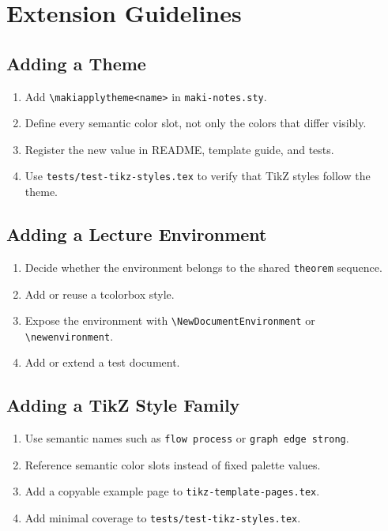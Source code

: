 \documentclass[a4paper,11pt]{ltxdoc}
\newcommand{\mfile}[1]{\texttt{#1}}
\newcommand{\mpkg}[1]{\textsf{#1}}
\newcommand{\mcmd}[1]{\texttt{\textbackslash#1}}
\newcommand{\mkey}[1]{\texttt{#1}}
\begin{document}
\section{Extension Guidelines}

\subsection{Adding a Theme}

\begin{enumerate}
\item Add \mcmd{makiapplytheme<name>} in \mfile{maki-notes.sty}.
\item Define every semantic color slot, not only the colors that differ visibly.
\item Register the new value in README, template guide, and tests.
\item Use \mfile{tests/test-tikz-styles.tex} to verify that TikZ styles follow the theme.
\end{enumerate}

\subsection{Adding a Lecture Environment}

\begin{enumerate}
\item Decide whether the environment belongs to the shared \mkey{theorem} sequence.
\item Add or reuse a \mpkg{tcolorbox} style.
\item Expose the environment with \mcmd{NewDocumentEnvironment} or \mcmd{newenvironment}.
\item Add or extend a test document.
\end{enumerate}

\subsection{Adding a TikZ Style Family}

\begin{enumerate}
\item Use semantic names such as \mkey{flow process} or \mkey{graph edge strong}.
\item Reference semantic color slots instead of fixed palette values.
\item Add a copyable example page to \mfile{tikz-template-pages.tex}.
\item Add minimal coverage to \mfile{tests/test-tikz-styles.tex}.
\end{enumerate}
\end{document}
